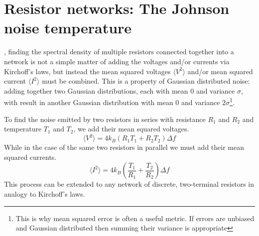 \section{Resistor networks: The Johnson noise temperature}
\label{section:TJN}
, finding the spectral density of multiple resistors connected together into a network is not a simple matter of adding the voltages and/or currents via Kirchoff's laws, but instead the mean squared voltages $\langle V^2\rangle$ and/or mean squared current $\langle I^2\rangle$ must be combined. This is a property of Gaussian distributed noise: adding together two Gaussian distributions, each with mean $0$ and variance $\sigma$, with result in another Gaussian distribution with mean $0$ and variance $2\sigma$\footnote{This is why mean squared error is often a useful metric. If errors are unbiased and Gaussian distributed then summing their variance is appropriate}.

To find the noise emitted by two resistors in series with resistance $R_1$ and $R_2$ and temperature $T_1$ and $T_2$, we add their mean squared voltages.
\begin{equation} \label{eq:seriesJN}
\langle V^2\rangle = 4k_B (R_1T_1+R_2T_2)\Delta f
\end{equation}
While in the case of the same two resistors in parallel we must add their mean squared currents.
\begin{equation} \label{eq:parallelJN}
\langle I^2\rangle = 4k_B \left(\frac{T_1}{R_1}+\frac{T_2}{R_2}\right)\Delta f
\end{equation}
This process can be extended to any network of discrete, two-terminal resistors in analogy to Kirchoff's laws.

